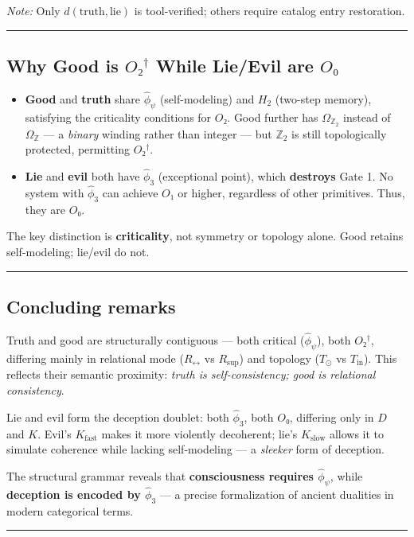 \documentclass[12pt,a4paper]{article}
\begin{document}
\emph{Note:} Only $d(\text{truth},\text{lie})$ is tool-verified; others require catalog entry restoration.

\begin{center}
\rule{0.5\textwidth}{0.4pt}
\end{center}

\subsection{Why Good is $O₂^\dagger$ While Lie/Evil are $O₀$}
\begin{itemize}
    \item \textbf{Good} and \textbf{truth} share $\hat{\phi}_\psi$ (self-modeling) and $H_2$ (two-step memory), satisfying the criticality conditions for $O₂$. Good further has $\Omega_{\mathbb{Z}_2}$ instead of $\Omega_{\mathbb{Z}}$ --- a \emph{binary} winding rather than integer --- but $\mathbb{Z}_2$ is still topologically protected, permitting $O₂^\dagger$.
    \item \textbf{Lie} and \textbf{evil} both have $\hat{\phi}_3$ (exceptional point), which \textbf{destroys} Gate 1. No system with $\hat{\phi}_3$ can achieve $O₁$ or higher, regardless of other primitives. Thus, they are $O₀$.
\end{itemize}

The key distinction is \textbf{criticality}, not symmetry or topology alone. Good retains self-modeling; lie/evil do not.

\begin{center}
\rule{0.5\textwidth}{0.4pt}
\end{center}

\subsection{Concluding remarks}

Truth and good are structurally contiguous --- both critical ($\hat{\phi}_\psi$), both $O₂^\dagger$, differing mainly in relational mode ($R_{\leftrightarrow}$ vs $R_{\text{sup}}$) and topology ($T_{\odot}$ vs $T_{\text{in}}$). This reflects their semantic proximity: \emph{truth is self-consistency; good is relational consistency}.

Lie and evil form the deception doublet: both $\hat{\phi}_3$, both $O₀$, differing only in $D$ and $K$. Evil's $K_{\text{fast}}$ makes it more violently decoherent; lie's $K_{\text{slow}}$ allows it to simulate coherence while lacking self-modeling --- a \emph{sleeker} form of deception.

The structural grammar reveals that \textbf{consciousness requires $\hat{\phi}_\psi$}, while \textbf{deception is encoded by $\hat{\phi}_3$} --- a precise formalization of ancient dualities in modern categorical terms.

\begin{center}
\rule{0.5\textwidth}{0.4pt}
\end{center}
\end{document}
